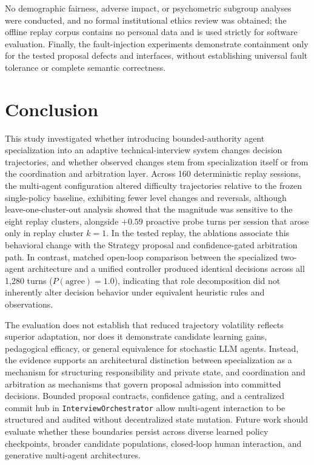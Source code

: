 \documentclass[runningheads]{llncs}
\begin{document}
No demographic fairness, adverse impact, or psychometric subgroup analyses were conducted, and no formal institutional ethics review was obtained; the offline replay corpus contains no personal data and is used strictly for software evaluation. Finally, the fault-injection experiments demonstrate containment only for the tested proposal defects and interfaces, without establishing universal fault tolerance or complete semantic correctness.

\section{Conclusion}

This study investigated whether introducing bounded-authority agent specialization into an adaptive technical-interview system changes decision trajectories, and whether observed changes stem from specialization itself or from the coordination and arbitration layer. Across 160 deterministic replay sessions, the multi-agent configuration altered difficulty trajectories relative to the frozen single-policy baseline, exhibiting fewer level changes and reversals, although leave-one-cluster-out analysis showed that the magnitude was sensitive to the eight replay clusters, alongside $+0.59$ proactive probe turns per session that arose only in replay cluster $k=1$. In the tested replay, the ablations associate this behavioral change with the Strategy proposal and confidence-gated arbitration path. In contrast, matched open-loop comparison between the specialized two-agent architecture and a unified controller produced identical decisions across all 1,280 turns ($P(\mathrm{agree})=1.0$), indicating that role decomposition did not inherently alter decision behavior under equivalent heuristic rules and observations.

The evaluation does not establish that reduced trajectory volatility reflects superior adaptation, nor does it demonstrate candidate learning gains, pedagogical efficacy, or general equivalence for stochastic LLM agents. Instead, the evidence supports an architectural distinction between specialization as a mechanism for structuring responsibility and private state, and coordination and arbitration as mechanisms that govern proposal admission into committed decisions. Bounded proposal contracts, confidence gating, and a centralized commit hub in \texttt{InterviewOrchestrator} allow multi-agent interaction to be structured and audited without decentralized state mutation. Future work should evaluate whether these boundaries persist across diverse learned policy checkpoints, broader candidate populations, closed-loop human interaction, and generative multi-agent architectures.



\end{document}
